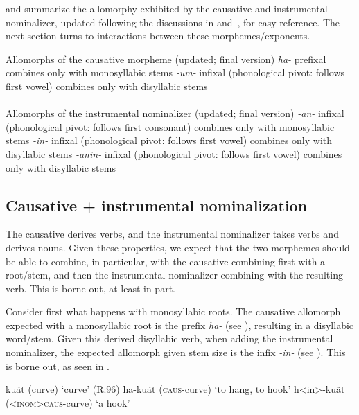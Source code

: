 \documentclass[output=paper]{langscibook}
\begin{document}
\Next and \NNext summarize the allomorphy exhibited by the causative and instrumental nominalizer, updated following the discussions in  and~, for easy reference. The next section turns to interactions between these morphemes/exponents.\largerpage

\ea Allomorphs of the causative morpheme (updated; final version) \label{kalincausallos2}
\ea \textit{ha-}
\ea  prefixal
\ex combines only with monosyllabic stems
\z
\ex \textit{-um-} \label{kalincausallosb2}
\ea infixal (phonological pivot: follows first vowel)
\ex combines only with disyllabic stems\\~\\
\z
\z
\ex Allomorphs of the instrumental nominalizer (updated; final version)  \label{kalininstallos2}
\ea \textit{-an-} \label{kalininstallosb2}
\ea  infixal (phonological pivot: follows first consonant)
\ex combines only with monosyllabic stems
\z
\ex \textit{-in-} \label{kalininstallosa2}
\ea infixal (phonological pivot: follows first vowel)
\ex combines only with disyllabic stems
\z
\ex \textit{-anin-} \label{kalininstallosc2}
\ea infixal (phonological pivot: follows first vowel)
\ex combines only with disyllabic stems
\z
\z
\z

\subsection{Causative + instrumental nominalization}\label{sec:kalin:3.4}

The causative derives verbs, and the instrumental nominalizer takes verbs and derives nouns. Given these properties, we expect that the two morphemes should be able to combine, in particular, with the causative combining first with a root/stem, and then the instrumental nominalizer combining with the resulting verb. This is borne out, at least in part. 

Consider first what happens with monosyllabic roots. The causative allomorph expected with a monosyllabic root is the prefix \textit{ha-} (see ), resulting in a disyllabic word/stem. Given this derived disyllabic verb, when adding the instrumental nominalizer, the expected allomorph given stem size is the infix \textit{-in-} (see ). This is borne out, as seen in \Next.

\ea 
\ea ku\~at (curve) \hfill `curve'  (R:96)
\ex ha-ku\~at (\textsc{caus-}curve) \hfill `to hang, to hook'
\ex\label{kalininstcaus} h<in>-ku\~at (\textsc{<inom>caus-}curve) \hfill `a hook'
\z
\z
\end{document}

